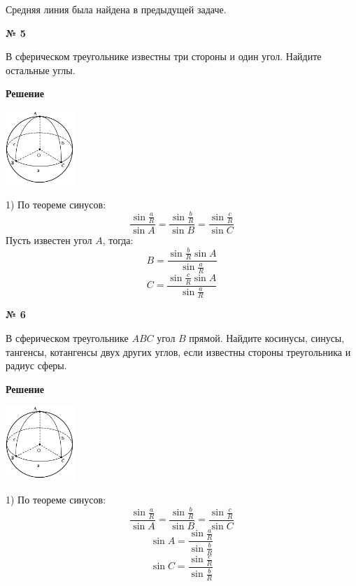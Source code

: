     Средняя линия была найдена в предыдущей задаче.

    \begin{center}
        \textbf{№ 5}
    \end{center}

    В сферическом треугольнике известны три стороны и один угол.
    Найдите остальные углы.

    \textbf{Решение}\\

    \begin{center}
        \includegraphics[width=0.2\textwidth]{images/img7}\\
    \end{center}

    1) По теореме синусов:
    \[
        \frac{\sin\frac{a}{R}}{\sin A} = \frac{\sin\frac{b}{R}}{\sin B} = \frac{\sin\frac{c}{R}}{\sin C}
    \]
    Пусть известен угол $A$, тогда:
    \[
        B = \frac{\sin \frac{b}{R}\sin A}{\sin\frac{a}{R}}
    \]
    \[
        C = \frac{\sin\frac{c}{R}\sin A}{\sin\frac{a}{R}}
    \]

    \begin{center}
        \textbf{№ 6}
    \end{center}

    В сферическом треугольнике $ABC$ угол $B$ прямой.
    Найдите косинусы, синусы, тангенсы, котангенсы двух других углов,
    если известны стороны треугольника и радиус сферы.

    \textbf{Решение}\\

    \begin{center}
        \includegraphics[width=0.2\textwidth]{images/img8}\\
    \end{center}

    1) По теореме синусов:
    \[
        \frac{\sin\frac{a}{R}}{\sin A} = \frac{\sin\frac{b}{R}}{\sin B} = \frac{\sin\frac{c}{R}}{\sin C}
    \]
    \[
        \sin A = \frac{\sin\frac{a}{R}}{\sin\frac{b}{R}}
    \]
    \[
        \sin C = \frac{\sin\frac{c}{R}}{\sin\frac{b}{R}}
    \]

